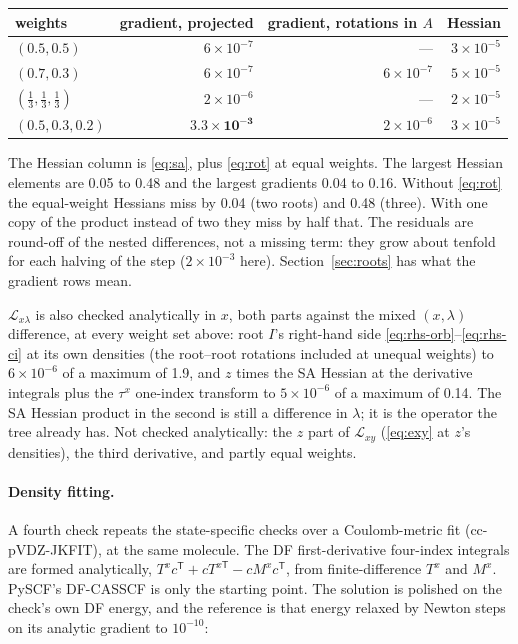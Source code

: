 \documentclass[11pt]{article}
\newcommand{\Lag}{\mathcal L}
\begin{document}
\begin{center}
\small
\begin{tabular}{@{}lrrr@{}}
\toprule
weights & gradient, projected & gradient, rotations in $A$ & Hessian \\
\midrule
$(0.5, 0.5)$ & $6\times10^{-7}$ & --- & $3\times10^{-5}$ \\
$(0.7, 0.3)$ & $6\times10^{-7}$ & $6\times10^{-7}$ & $5\times10^{-5}$ \\
$(\frac13, \frac13, \frac13)$ & $2\times10^{-6}$ & --- & $2\times10^{-5}$ \\
$(0.5, 0.3, 0.2)$ & $\mathbf{3.3\times10^{-3}}$ & $2\times10^{-6}$ & $3\times10^{-5}$ \\
\bottomrule
\end{tabular}
\end{center}

\noindent The Hessian column is \eqref{eq:sa}, plus \eqref{eq:rot} at
equal weights. The largest Hessian elements are 0.05 to 0.48 and the
largest gradients 0.04 to 0.16. Without \eqref{eq:rot} the equal-weight
Hessians miss by 0.04 (two roots) and 0.48 (three). With one copy of the
product instead of two they miss by half that. The residuals are
round-off of the nested differences, not a missing term: they grow about
tenfold for each halving of the step ($2\times10^{-3}$ here).
Section~\ref{sec:roots} has what the gradient rows mean.

$\Lag_{x\lambda}$ is also checked analytically in $x$, both parts against
the mixed $(x,\lambda)$ difference, at every weight set above: root $I$'s
right-hand side \eqref{eq:rhs-orb}--\eqref{eq:rhs-ci} at its own densities
(the root--root rotations included at unequal weights) to $6\times10^{-6}$
of a maximum of 1.9, and $z$ times the SA Hessian at the derivative
integrals plus the $\tau^x$ one-index transform to $5\times10^{-6}$ of a
maximum of 0.14. The SA Hessian product in the second is still a difference
in $\lambda$; it is the operator the tree already has. Not checked
analytically: the $z$ part of $\Lag_{xy}$ (\eqref{eq:exy} at $z$'s
densities), the third derivative, and partly equal weights.

\paragraph{Density fitting.} A fourth check repeats the state-specific
checks over a Coulomb-metric fit (cc-pVDZ-JKFIT), at the same molecule.
The DF first-derivative four-index integrals are formed analytically,
$T^xc^{\mathsf T} + cT^{x\mathsf T} - cM^xc^{\mathsf T}$, from
finite-difference $T^x$ and $M^x$. PySCF's DF-CASSCF is only the starting
point. The solution is polished on the check's own DF energy, and the
reference is that energy relaxed by Newton steps on its analytic gradient
to $10^{-10}$:
\end{document}
